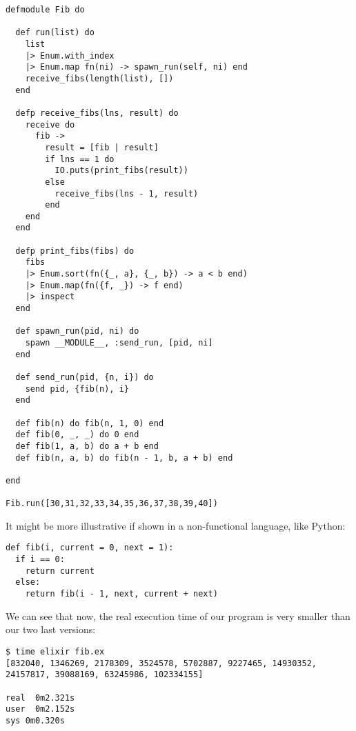 \begin{lstlisting}[label=dartMap,caption=Parallel Fibonacci with tail call optimization]
defmodule Fib do

  def run(list) do
    list
    |> Enum.with_index
    |> Enum.map fn(ni) -> spawn_run(self, ni) end
    receive_fibs(length(list), [])
  end

  defp receive_fibs(lns, result) do
    receive do
      fib ->
        result = [fib | result]
        if lns == 1 do
          IO.puts(print_fibs(result))
        else
          receive_fibs(lns - 1, result)
        end
    end
  end

  defp print_fibs(fibs) do
    fibs
    |> Enum.sort(fn({_, a}, {_, b}) -> a < b end)
    |> Enum.map(fn({f, _}) -> f end)
    |> inspect
  end

  def spawn_run(pid, ni) do
    spawn __MODULE__, :send_run, [pid, ni]
  end

  def send_run(pid, {n, i}) do
    send pid, {fib(n), i}
  end

  def fib(n) do fib(n, 1, 0) end
  def fib(0, _, _) do 0 end
  def fib(1, a, b) do a + b end
  def fib(n, a, b) do fib(n - 1, b, a + b) end

end

Fib.run([30,31,32,33,34,35,36,37,38,39,40])
\end{lstlisting}

It might be more illustrative if shown in a non-functional language, like Python:

\begin{lstlisting}[label=ppppp,caption=Python tail call optimization for Fibonacci]
def fib(i, current = 0, next = 1):
  if i == 0:
    return current
  else:
    return fib(i - 1, next, current + next)
\end{lstlisting}

We can see that now, the real execution time of our program is very smaller than
our two last versions:

\begin{verbatim}
$ time elixir fib.ex 
[832040, 1346269, 2178309, 3524578, 5702887, 9227465, 14930352, 24157817, 39088169, 63245986, 102334155]

real  0m2.321s
user  0m2.152s
sys 0m0.320s
\end{verbatim}
